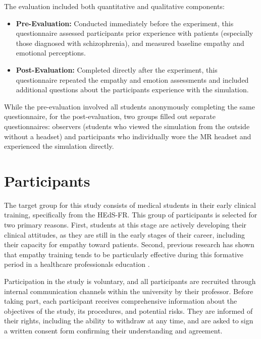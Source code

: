 \vspace{1em}
\vspace{1em}
The evaluation included both quantitative and qualitative components:

\begin{itemize}
  \item \textbf{Pre-Evaluation:} Conducted immediately before the experiment, this questionnaire assessed participants prior experience with patients (especially those diagnosed with schizophrenia), and measured baseline empathy and emotional perceptions.
  \item \textbf{Post-Evaluation:} Completed directly after the experiment, this questionnaire repeated the empathy and emotion assessments and included additional questions about the participants experience with the simulation.
\end{itemize}

While the pre-evaluation involved all students anonymously completing the same questionnaire, for the post-evaluation, two groups filled out separate questionnaires: observers (students who viewed the simulation from the outside without a headset) and participants who individually wore the MR headset and experienced the simulation directly.


\section{Participants}

The target group for this study consists of medical students in their early clinical training, specifically from the HEdS-FR. This group of participants is selected for two primary reasons. First, students at this stage are actively developing their clinical attitudes, as they are still in the early stages of their career, including their capacity for empathy toward patients. Second, previous research has shown that empathy training tends to be particularly effective during this formative period in a healthcare professionals education \cite{Hsia2022, Kuhail2022}.

\vspace{1em}

Participation in the study is voluntary, and all participants are recruited through internal communication channels within the university by their professor. Before taking part, each participant receives comprehensive information about the objectives of the study, its procedures, and potential risks. They are informed of their rights, including the ability to withdraw at any time, and are asked to sign a written consent form confirming their understanding and agreement.


